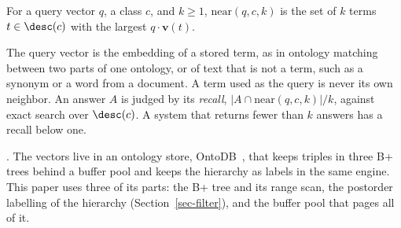 \begin{definition}
\label{def-near}
For a query vector $q$, a class $c$, and $k\ge 1$, $\mathrm{near}(q,c,k)$ is the
set of $k$ terms $t\in\desc(c)$ with the largest $q\cdot\mathbf{v}(t)$.
\end{definition}

\noindent
The query vector is the embedding of a stored term, as in ontology matching between
two parts of one ontology, or of text that is not a term, such as a synonym or a word
from a document.
A term used as the query is never its own neighbor.
An answer $A$ is judged by its \emph{recall}, $|A\cap\mathrm{near}(q,c,k)|/k$, against
exact search over $\desc(c)$.
A system that returns fewer than $k$ answers has a recall below one.

.
The vectors live in an ontology store, OntoDB~\cite{ontodb}, that keeps triples in three
B+ trees behind a buffer pool and keeps the hierarchy as labels in the same engine.
This paper uses three of its parts: the B+ tree and its range scan, the postorder
labelling of the hierarchy (Section~\ref{sec-filter}), and the buffer pool that pages
all of it.
